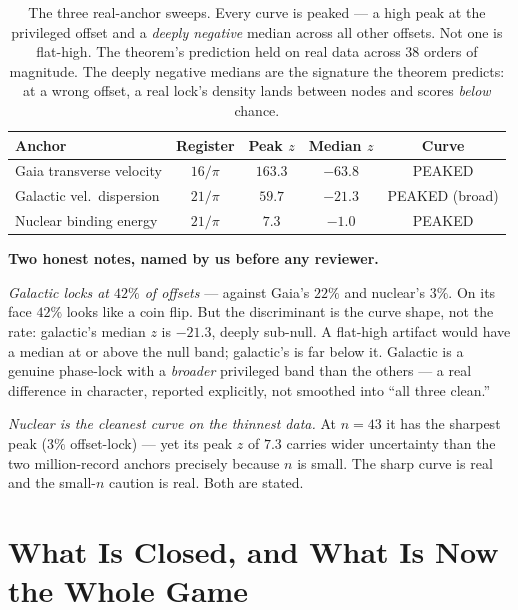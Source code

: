\documentclass[11pt, letterpaper, openany]{book}
\begin{document}
\begin{empiricalbox}
\begin{table}[H]
\centering
\renewcommand{\arraystretch}{1.4}
\begin{tabular}{|l|c|c|c|c|}
\hline
\rowcolor{kishblue!10}
\textbf{Anchor} & \textbf{Register} & \textbf{Peak $z$} & \textbf{Median $z$} & \textbf{Curve} \\
\hline\hline
Gaia transverse velocity & $16/\pi$ & $163.3$ & $-63.8$ & PEAKED \\
\hline
\rowcolor{kishblue!3}
Galactic vel.\ dispersion & $21/\pi$ & $59.7$ & $-21.3$ & PEAKED (broad) \\
\hline
Nuclear binding energy & $21/\pi$ & $7.3$ & $-1.0$ & PEAKED \\
\hline
\end{tabular}
\caption{The three real-anchor sweeps. Every curve is peaked --- a high peak at the
privileged offset and a \emph{deeply negative} median across all other offsets. Not
one is flat-high. The theorem's prediction held on real data across $38$ orders of
magnitude. The deeply negative medians are the signature the theorem predicts: at a
wrong offset, a real lock's density lands between nodes and scores \emph{below}
chance.}
\label{tab:three_curves}
\end{table}

\begin{empiricalbox}
\textbf{Two honest notes, named by us before any reviewer.}

\textit{Galactic locks at $42\%$ of offsets} --- against Gaia's $22\%$ and nuclear's
$3\%$. On its face $42\%$ looks like a coin flip. But the discriminant is the curve
shape, not the rate: galactic's median $z$ is $-21.3$, deeply sub-null. A flat-high
artifact would have a median at or above the null band; galactic's is far below it.
Galactic is a genuine phase-lock with a \emph{broader} privileged band than the
others --- a real difference in character, reported explicitly, not smoothed into
``all three clean.''

\textit{Nuclear is the cleanest curve on the thinnest data.} At $n=43$ it has the
sharpest peak ($3\%$ offset-lock) --- yet its peak $z$ of $7.3$ carries wider
uncertainty than the two million-record anchors precisely because $n$ is small. The
sharp curve is real and the small-$n$ caution is real. Both are stated.
\end{empiricalbox}

\section{What Is Closed, and What Is Now the Whole Game}


\end{empiricalbox}
\end{document}
